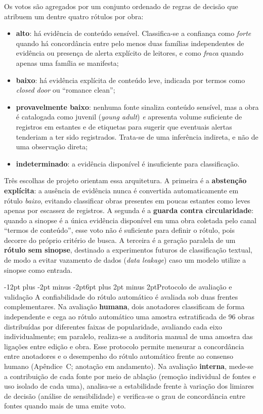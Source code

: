 \documentclass[12pt]{article}
\makeatletter
\renewcommand{\subsection}{\@startsection{subsection}{2}{\z@}%
  {-12pt plus -2pt minus -2pt}{6pt plus 2pt minus 2pt}{\normalfont\normalsize\bfseries}}
\makeatother
\begin{document}
Os votos são agregados por um conjunto ordenado de regras de decisão que atribuem um dentre quatro rótulos por obra:
\begin{itemize}
  \item \textbf{alto}: há evidência de conteúdo sensível. Classifica-se a confiança como \emph{forte} quando há concordância entre pelo menos duas famílias independentes de evidência ou presença de alerta explícito de leitores, e como \emph{fraca} quando apenas uma família se manifesta;
  \item \textbf{baixo}: há evidência explícita de conteúdo leve, indicada por termos como \emph{closed door} ou ``romance clean'';
  \item \textbf{provavelmente baixo}: nenhuma fonte sinaliza conteúdo sensível, mas a obra é catalogada como juvenil (\emph{young adult}) \emph{e} apresenta volume suficiente de registros em estantes e de etiquetas para sugerir que eventuais alertas tenderiam a ter sido registrados. Trata-se de uma inferência indireta, e não de uma observação direta;
  \item \textbf{indeterminado}: a evidência disponível é insuficiente para classificação.
\end{itemize}

Três escolhas de projeto orientam essa arquitetura. A primeira é a \textbf{abstenção explícita}: a ausência de evidência nunca é convertida automaticamente em rótulo \emph{baixo}, evitando classificar obras presentes em poucas estantes como leves apenas por escassez de registros. A segunda é a \textbf{guarda contra circularidade}: quando a sinopse é a única evidência disponível em uma obra coletada pelo canal ``termos de conteúdo'', esse voto não é suficiente para definir o rótulo, pois decorre do próprio critério de busca. A terceira é a geração paralela de um \textbf{rótulo sem sinopse}, destinado a experimentos futuros de classificação textual, de modo a evitar vazamento de dados (\emph{data leakage}) caso um modelo utilize a sinopse como entrada.

\subsection{Protocolo de avaliação e validação}
\label{sec:validacao}
A confiabilidade do rótulo automático é avaliada sob duas frentes complementares. Na avaliação \textbf{humana}, dois anotadores classificam de forma independente e cega ao rótulo automático uma amostra estratificada de 96 obras distribuídas por diferentes faixas de popularidade, avaliando cada eixo individualmente; em paralelo, realiza-se a auditoria manual de uma amostra das ligações entre edição e obra. Esse protocolo permite mensurar a concordância entre anotadores e o desempenho do rótulo automático frente ao consenso humano (Apêndice~C; anotação em andamento). Na avaliação \textbf{interna}, mede-se a contribuição de cada fonte por meio de ablação (remoção individual de fontes e uso isolado de cada uma), analisa-se a estabilidade frente à variação dos limiares de decisão (análise de sensibilidade) e verifica-se o grau de concordância entre fontes quando mais de uma emite voto.
\end{document}
